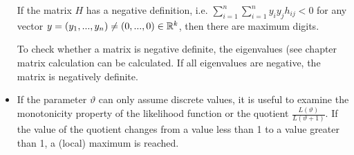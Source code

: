 \documentclass[ 11pt,%
				a4paper,%
				twoside,%
				headinclude,%
				footinclude = true,%
				cleardoublepage = empty,%
				reqno]{scrbook}
\begin{document}
\begin{remark}
\begin{itemize}
If the matrix $H$ has a negative definition, i.e. $\sum_{i=1}^{n}{\sum_{i=1}^{n}{y_i y_j h_{ij}}} < 0$ for any vector $y=(y_1, ..., y_n) \neq (0, ...,0) \in \mathbb{R}^k$, then there are maximum digits.

To check whether a matrix is negative definite, the eigenvalues (see chapter matrix calculation can be calculated. If all eigenvalues are negative, the matrix is negatively definite.

\item If the parameter $\vartheta$ can only assume discrete values, it is useful to examine the monotonicity property of the likelihood function or the quotient $\frac{L(\vartheta)}{L(\vartheta + 1)}$. If the value of the quotient changes from a value less than 1 to a value greater than 1, a (local) maximum is reached.
\end{itemize}
\end{remark}

\end{document}
